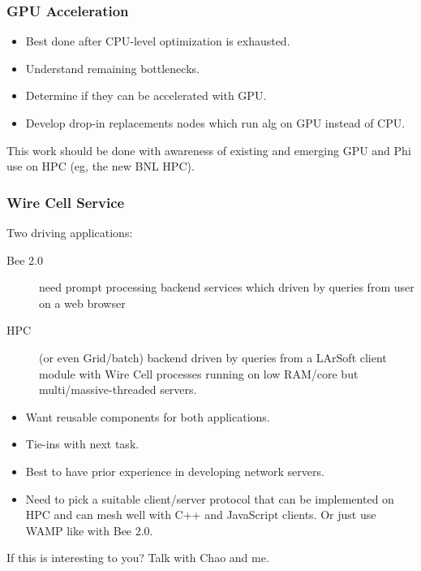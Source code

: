\documentclass[xcolor=dvipsnames]{beamer}
\begin{document}
\begin{frame}
  \frametitle{GPU Acceleration}
  \begin{itemize}
  \item Best done after CPU-level optimization is exhausted.
  \item Understand remaining bottlenecks.
  \item Determine if they can be accelerated with GPU.
  \item Develop drop-in replacements nodes which run alg on GPU instead of CPU.
  \end{itemize}

  This work should be done with awareness of existing and emerging GPU
  and Phi use on HPC (eg, the new BNL HPC).

\end{frame}

\begin{frame}
  \frametitle{Wire Cell Service}

  Two driving applications:
  \begin{description}
  \item[Bee 2.0] need prompt processing backend services which driven
    by queries from user on a web browser
  \item[HPC] (or even Grid/batch) backend driven by queries from a
    LArSoft client module with Wire Cell processes running on low
    RAM/core but multi/massive-threaded servers.
  \end{description}

  \begin{itemize}
  \item Want reusable components for both applications.
  \item Tie-ins with next task.
  \item Best to have prior experience in developing network servers.
  \item Need to pick a suitable client/server protocol that can be
    implemented on HPC and can mesh well with C++ and JavaScript
    clients.  Or just use WAMP like with Bee 2.0.
  \end{itemize}

  If this is interesting to you?  Talk with Chao and me.

\end{frame}
\end{document}
